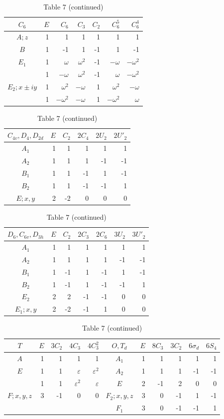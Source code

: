\begin{table}[p]\centering\small
\caption*{Table 7 (continued)}
\begin{tabular}{c|rrrrrr}
$C_6$&$E$&$C_6$&$C_3$&$C_2$&$C_6^5$&$C_6^4$\\\hline
$A;z$&1&1&1&1&1&1\\ $B$&1&-1&1&-1&1&-1\\
$E_1$&1&$\omega$&$\omega^2$&-1&$-\omega$&$-\omega^2$\\
&1&$-\omega$&$\omega^2$&-1&$\omega$&$-\omega^2$\\
$E_2;x\pm iy$&1&$\omega^2$&$-\omega$&1&$\omega^2$&$-\omega$\\
&1&$-\omega^2$&$-\omega$&1&$-\omega^2$&$\omega$
\end{tabular}

\medskip
\begin{tabular}{c|rrrrr}
$C_{4v},D_4,D_{2d}$&$E$&$C_2$&$2C_4$&$2U_2$&$2U'_2$\\\hline
$A_1$&1&1&1&1&1\\ $A_2$&1&1&1&-1&-1\\
$B_1$&1&1&-1&1&-1\\ $B_2$&1&1&-1&-1&1\\ $E;x,y$&2&-2&0&0&0
\end{tabular}
\end{table}

\begin{table}[p]\centering\small
\caption*{Table 7 (continued)}
\begin{tabular}{c|rrrrrr}
$D_6,C_{6v},D_{3h}$&$E$&$C_2$&$2C_3$&$2C_6$&$3U_2$&$3U'_2$\\\hline
$A_1$&1&1&1&1&1&1\\ $A_2$&1&1&1&1&-1&-1\\
$B_1$&1&-1&1&-1&1&-1\\ $B_2$&1&-1&1&-1&-1&1\\
$E_2$&2&2&-1&-1&0&0\\ $E_1;x,y$&2&-2&-1&1&0&0
\end{tabular}

\medskip
\begin{tabular}{c|rrrr|c|rrrrr}
$T$&$E$&$3C_2$&$4C_3$&$4C_3^2$&$O,T_d$&$E$&$8C_3$&$3C_2$&$6\sigma_d$&$6S_4$\\\hline
$A$&1&1&1&1&$A_1$&1&1&1&1&1\\
$E$&1&1&$\varepsilon$&$\varepsilon^2$&$A_2$&1&1&1&-1&-1\\
&1&1&$\varepsilon^2$&$\varepsilon$&$E$&2&-1&2&0&0\\
$F;x,y,z$&3&-1&0&0&$F_2;x,y,z$&3&0&-1&1&-1\\
&&&&&$F_1$&3&0&-1&-1&1
\end{tabular}
\end{table}

